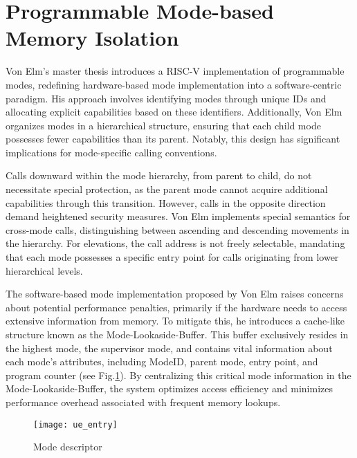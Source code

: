 \section{Programmable Mode-based Memory Isolation}
Von Elm's master thesis \cite{Cve} introduces a RISC-V implementation of
programmable modes, redefining hardware-based mode implementation into a
software-centric paradigm. His approach involves identifying modes through
unique IDs and allocating explicit capabilities based on these identifiers.
Additionally, Von Elm organizes modes in a hierarchical structure, ensuring that
each child mode possesses fewer capabilities than its parent. Notably, this
design has significant implications for mode-specific calling conventions.\par
Calls downward within the mode hierarchy, from parent to child, do not
necessitate special protection, as the parent mode cannot acquire additional
capabilities through this transition. However, calls in the opposite direction
demand heightened security measures. Von Elm implements special semantics for
cross-mode calls, distinguishing between ascending and descending movements in
the hierarchy. For elevations, the call address is not freely selectable,
mandating that each mode possesses a specific entry point for calls originating
from lower hierarchical levels.\par 
The software-based mode implementation proposed by Von Elm raises concerns about
potential performance penalties, primarily if the hardware needs to access
extensive information from memory. To mitigate this, he introduces a cache-like
structure known as the Mode-Lookaside-Buffer. This buffer exclusively resides in
the highest mode, the supervisor mode, and contains vital information about each
mode's attributes, including ModeID, parent mode, entry point, and program
counter (see Fig.\ref{fig:mode_desc}). By centralizing this critical mode
information in the Mode-Lookaside-Buffer, the system optimizes access efficiency
and minimizes performance overhead associated with frequent memory lookups.

\begin{figure}[h]
    \centering
    \texttt{[image: ue\_entry]}
    \caption{Mode descriptor}
    \label{fig:mode_desc}
\end{figure}


